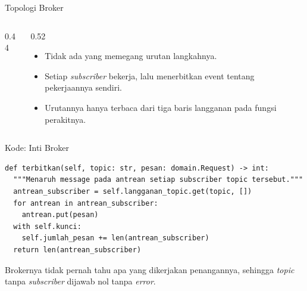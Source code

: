 \documentclass[aspectratio=169, table, 12pt]{beamer}
\begin{document}
\begin{frame}{{\Large Topologi Broker}}
  \vspace{6pt}
  \begin{columns}[T]
    \begin{column}{0.44\textwidth}
      \centering
    \end{column}
    \begin{column}{0.52\textwidth}
      \begin{itemize}\small
        \item Tidak ada yang memegang urutan langkahnya.
        \item Setiap \textit{subscriber} bekerja, lalu menerbitkan event
              tentang pekerjaannya sendiri.
        \item Urutannya hanya terbaca dari tiga baris langganan pada fungsi
              perakitnya.
      \end{itemize}
    \end{column}
  \end{columns}
\end{frame}

\begin{frame}[fragile]{{\Large Kode: Inti Broker}}
  \vspace{6pt}
\begin{lstlisting}[style=PythonStyle]
def terbitkan(self, topic: str, pesan: domain.Request) -> int:
  """Menaruh message pada antrean setiap subscriber topic tersebut."""
  antrean_subscriber = self.langganan_topic.get(topic, [])
  for antrean in antrean_subscriber:
    antrean.put(pesan)
  with self.kunci:
    self.jumlah_pesan += len(antrean_subscriber)
  return len(antrean_subscriber)
\end{lstlisting}

  \vspace{4pt}
  {\small Brokernya tidak pernah tahu apa yang dikerjakan penangannya, sehingga
  \textit{topic} tanpa \textit{subscriber} dijawab nol tanpa \textit{error}.}
\end{frame}
\end{document}
